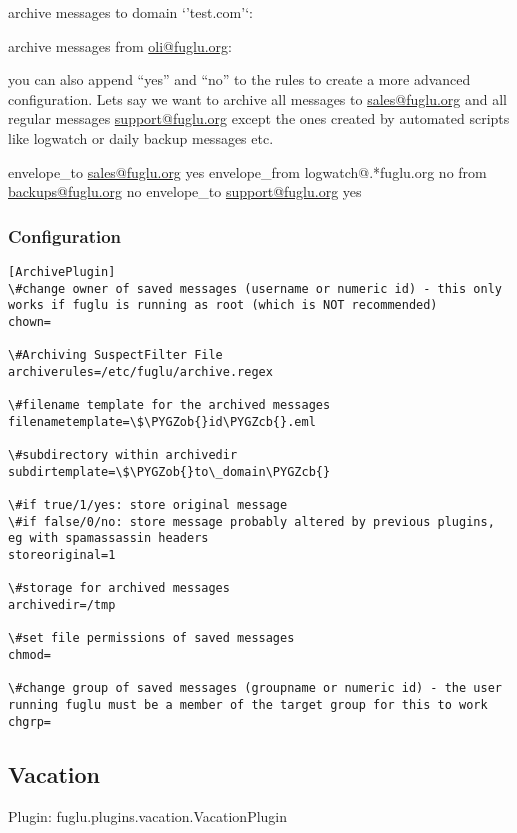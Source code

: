 \documentclass[letterpaper,10pt,english]{sphinxmanual}
\def\PYGZob{\char`\{}
\def\PYGZcb{\char`\}}
\begin{document}
archive messages to domain `'test.com'`:


archive messages from \href{mailto:oli@fuglu.org}{oli@fuglu.org}:


you can also append ``yes'' and ``no'' to the rules to create a more advanced configuration. Lets say we want to archive all messages to \href{mailto:sales@fuglu.org}{sales@fuglu.org} and all regular messages \href{mailto:support@fuglu.org}{support@fuglu.org} except the ones created by automated scripts like logwatch or daily backup messages etc.

envelope\_to \href{mailto:sales@fuglu.org}{sales@fuglu.org} yes
envelope\_from logwatch@.*fuglu.org   no
from \href{mailto:backups@fuglu.org}{backups@fuglu.org} no
envelope\_to \href{mailto:support@fuglu.org}{support@fuglu.org}      yes


\subsubsection{Configuration}
\label{plugins-index:id3}
\begin{Verbatim}[commandchars=\\\{\}]
[ArchivePlugin]
\#change owner of saved messages (username or numeric id) - this only works if fuglu is running as root (which is NOT recommended)
chown=

\#Archiving SuspectFilter File
archiverules=/etc/fuglu/archive.regex

\#filename template for the archived messages
filenametemplate=\$\PYGZob{}id\PYGZcb{}.eml

\#subdirectory within archivedir
subdirtemplate=\$\PYGZob{}to\_domain\PYGZcb{}

\#if true/1/yes: store original message
\#if false/0/no: store message probably altered by previous plugins, eg with spamassassin headers
storeoriginal=1

\#storage for archived messages
archivedir=/tmp

\#set file permissions of saved messages
chmod=

\#change group of saved messages (groupname or numeric id) - the user running fuglu must be a member of the target group for this to work
chgrp=
\end{Verbatim}


\subsection{Vacation}
\label{plugins-index:vacation}
Plugin: fuglu.plugins.vacation.VacationPlugin
\end{document}
